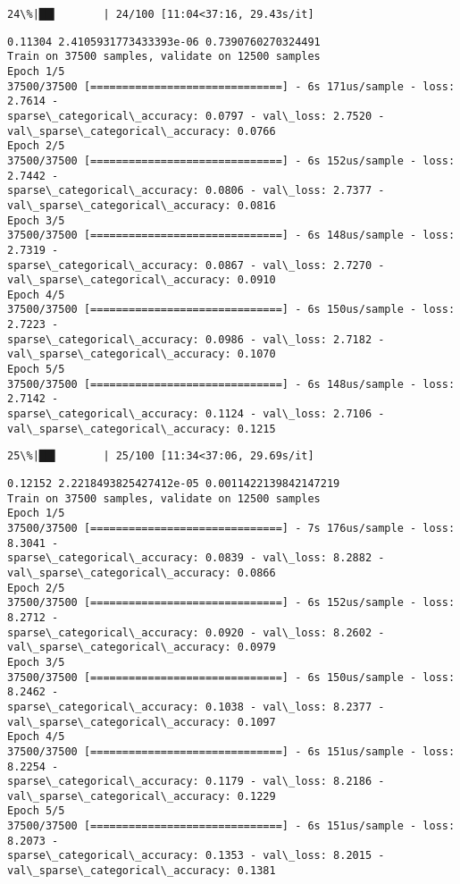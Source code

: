 \documentclass[11pt]{article}
\begin{document}
    \begin{Verbatim}[commandchars=\\\{\}]
 24\%|██▍       | 24/100 [11:04<37:16, 29.43s/it]
    \end{Verbatim}

    \begin{Verbatim}[commandchars=\\\{\}]
0.11304 2.4105931773433393e-06 0.7390760270324491
Train on 37500 samples, validate on 12500 samples
Epoch 1/5
37500/37500 [==============================] - 6s 171us/sample - loss: 2.7614 -
sparse\_categorical\_accuracy: 0.0797 - val\_loss: 2.7520 -
val\_sparse\_categorical\_accuracy: 0.0766
Epoch 2/5
37500/37500 [==============================] - 6s 152us/sample - loss: 2.7442 -
sparse\_categorical\_accuracy: 0.0806 - val\_loss: 2.7377 -
val\_sparse\_categorical\_accuracy: 0.0816
Epoch 3/5
37500/37500 [==============================] - 6s 148us/sample - loss: 2.7319 -
sparse\_categorical\_accuracy: 0.0867 - val\_loss: 2.7270 -
val\_sparse\_categorical\_accuracy: 0.0910
Epoch 4/5
37500/37500 [==============================] - 6s 150us/sample - loss: 2.7223 -
sparse\_categorical\_accuracy: 0.0986 - val\_loss: 2.7182 -
val\_sparse\_categorical\_accuracy: 0.1070
Epoch 5/5
37500/37500 [==============================] - 6s 148us/sample - loss: 2.7142 -
sparse\_categorical\_accuracy: 0.1124 - val\_loss: 2.7106 -
val\_sparse\_categorical\_accuracy: 0.1215
    \end{Verbatim}

    \begin{Verbatim}[commandchars=\\\{\}]
 25\%|██▌       | 25/100 [11:34<37:06, 29.69s/it]
    \end{Verbatim}

    \begin{Verbatim}[commandchars=\\\{\}]
0.12152 2.2218493825427412e-05 0.0011422139842147219
Train on 37500 samples, validate on 12500 samples
Epoch 1/5
37500/37500 [==============================] - 7s 176us/sample - loss: 8.3041 -
sparse\_categorical\_accuracy: 0.0839 - val\_loss: 8.2882 -
val\_sparse\_categorical\_accuracy: 0.0866
Epoch 2/5
37500/37500 [==============================] - 6s 152us/sample - loss: 8.2712 -
sparse\_categorical\_accuracy: 0.0920 - val\_loss: 8.2602 -
val\_sparse\_categorical\_accuracy: 0.0979
Epoch 3/5
37500/37500 [==============================] - 6s 150us/sample - loss: 8.2462 -
sparse\_categorical\_accuracy: 0.1038 - val\_loss: 8.2377 -
val\_sparse\_categorical\_accuracy: 0.1097
Epoch 4/5
37500/37500 [==============================] - 6s 151us/sample - loss: 8.2254 -
sparse\_categorical\_accuracy: 0.1179 - val\_loss: 8.2186 -
val\_sparse\_categorical\_accuracy: 0.1229
Epoch 5/5
37500/37500 [==============================] - 6s 151us/sample - loss: 8.2073 -
sparse\_categorical\_accuracy: 0.1353 - val\_loss: 8.2015 -
val\_sparse\_categorical\_accuracy: 0.1381
    \end{Verbatim}
\end{document}
